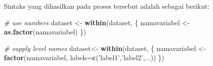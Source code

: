 \documentclass[12pt,]{krantz}
\newenvironment{Shaded}{\begin{snugshade}}{\end{snugshade}}
\newcommand{\CommentTok}[1]{\textcolor[rgb]{0.56,0.35,0.01}{\textit{#1}}}
\newcommand{\DataTypeTok}[1]{\textcolor[rgb]{0.13,0.29,0.53}{#1}}
\newcommand{\KeywordTok}[1]{\textcolor[rgb]{0.13,0.29,0.53}{\textbf{#1}}}
\newcommand{\NormalTok}[1]{#1}
\newcommand{\StringTok}[1]{\textcolor[rgb]{0.31,0.60,0.02}{#1}}
\begin{document}
Sintaks yang dihasilkan pada proses tersebut adalah sebagai berikut:

\begin{Shaded}
\begin{Highlighting}[]
\CommentTok{# use numbers}
\NormalTok{dataset <-}\StringTok{ }\KeywordTok{within}\NormalTok{(dataset, \{}
\NormalTok{  namavariabel <-}\StringTok{ }\KeywordTok{as.factor}\NormalTok{(namavariabel)}
\NormalTok{\})}

\CommentTok{# supply level names}
\NormalTok{dataset<-}\StringTok{ }\KeywordTok{within}\NormalTok{(dataset, \{}
\NormalTok{  namavariabel <-}\StringTok{ }\KeywordTok{factor}\NormalTok{(namavariabel, }
                         \DataTypeTok{labels=}\KeywordTok{c}\NormalTok{(}\StringTok{'label1'}\NormalTok{,}\StringTok{'label2'}\NormalTok{,...))}
\NormalTok{\})}
\end{Highlighting}
\end{Shaded}
\end{document}
